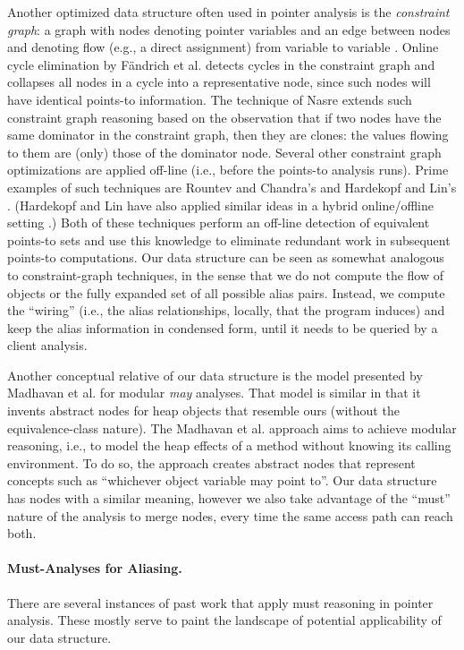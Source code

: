 Another optimized data structure often used in pointer analysis is the
\emph{constraint graph}: a graph with nodes denoting pointer variables
and an edge between nodes  and  denoting flow (e.g., a
direct assignment) from variable  to variable .  Online
cycle elimination by F\"{a}ndrich et al.
\cite{pldi:1998:Fahndrich} detects cycles in the
constraint graph and collapses all nodes in a cycle into a
representative node, since such nodes will have identical points-to
information. The technique of Nasre
\cite{ismm:2012:Nasre} extends such constraint graph
reasoning based on the observation that if two nodes have the same
dominator in the constraint graph, then they are clones: the values
flowing to them are (only) those of the dominator node. Several other
constraint graph optimizations are applied off-line (i.e., before the
points-to analysis runs).  Prime examples of such techniques are
Rountev and Chandra's \cite{pldi:2000:Rountev} and Hardekopf and Lin's
\cite{sas:2007:Hardekopf}. (Hardekopf and Lin have also applied similar
ideas in a hybrid online/offline setting \cite{pldi:2007:Hardekopf}.)  Both
of these techniques perform an off-line detection of equivalent
points-to sets and use this knowledge to eliminate redundant work in
subsequent points-to computations. Our data structure can be seen as
somewhat analogous to constraint-graph techniques, in the sense that
we do not compute the flow of objects or the fully expanded set of all
possible alias pairs. Instead, we compute the ``wiring'' (i.e., the
alias relationships, locally, that the program induces) and keep the
alias information in condensed form, until it needs to be queried by a
client analysis.

Another conceptual relative of our data structure is the model
presented by Madhavan et al. \cite{article:2015:Madhavan} for modular \emph{may}
analyses. That model is similar in that it invents abstract nodes for
heap objects that resemble ours (without the equivalence-class
nature). The Madhavan et al. approach aims to achieve modular
reasoning, i.e., to model the heap effects of a method without knowing
its calling environment. To do so, the approach creates abstract
nodes that represent concepts such as ``whichever object variable
 may point to''. Our data structure has nodes with a similar
meaning, however we also take advantage of the ``must'' nature of
the analysis to merge nodes, every time the same access path can
reach both.


\paragraph{Must-Analyses for Aliasing.}
There are several instances of past work that apply must reasoning in
pointer analysis. These mostly serve to paint the landscape of
potential applicability of our data structure.

